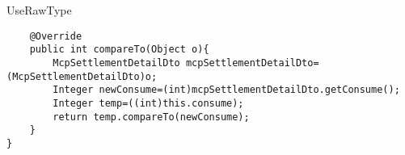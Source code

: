\begin{pattern}{UseRawType}
\begin{verbatim}
    @Override
    public int compareTo(Object o){
        McpSettlementDetailDto mcpSettlementDetailDto=(McpSettlementDetailDto)o;
        Integer newConsume=(int)mcpSettlementDetailDto.getConsume();
        Integer temp=((int)this.consume);
        return temp.compareTo(newConsume);
    }
}
\end{verbatim}




\detection{}

\discussion{}

\related{}

\end{pattern}